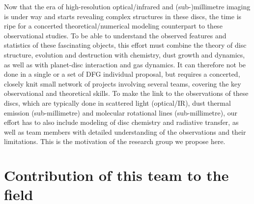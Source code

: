 \documentclass[10pt,fleqn,twoside]{article}
\begin{document}
  Now that the
  era of high-resolution optical/infrared and (sub-)millimetre imaging is
  under way and starts revealing complex structures in these discs, the time
  is ripe for a concerted theoretical/numerical modeling counterpart to
  these observational studies. To be able to understand the observed
  features and statistics of these fascinating objects, this effort must combine the
  theory of disc structure, evolution and destruction with chemistry, dust growth and
  dynamics, as well as with planet-disc interaction and gas dynamics. It can
  therefore not be done in a single or a set of DFG individual proposal, but
  requires a concerted, closely knit small network of projects involving
  several teams, covering the key observational and theoretical
  skills. To make the link to the observations of these discs, 
  which are typically done in scattered light (optical/IR), dust thermal
  emission (sub-millimetre) and molecular rotational lines (sub-millimetre),
  our effort has to also include modeling of disc chemistry and radiative
  transfer, as well as team members with detailed understanding of the
  observations and their limitations. This is the motivation of the research
  group we propose here.


\section{Contribution of this team to the field }
%
\end{document}

